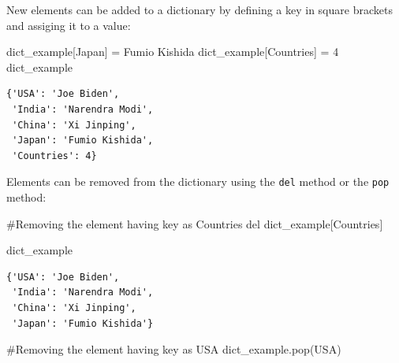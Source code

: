 \documentclass[
  letterpaper,
  DIV=11,
  numbers=noendperiod]{scrreprt}
\newenvironment{Shaded}{\begin{snugshade}}{\end{snugshade}}
\newcommand{\CommentTok}[1]{\textcolor[rgb]{0.37,0.37,0.37}{#1}}
\newcommand{\DecValTok}[1]{\textcolor[rgb]{0.68,0.00,0.00}{#1}}
\newcommand{\KeywordTok}[1]{\textcolor[rgb]{0.00,0.23,0.31}{#1}}
\newcommand{\NormalTok}[1]{\textcolor[rgb]{0.00,0.23,0.31}{#1}}
\newcommand{\OperatorTok}[1]{\textcolor[rgb]{0.37,0.37,0.37}{#1}}
\newcommand{\StringTok}[1]{\textcolor[rgb]{0.13,0.47,0.30}{#1}}
\begin{document}
New elements can be added to a dictionary by defining a key in square
brackets and assiging it to a value:

\begin{Shaded}
\begin{Highlighting}[]
\NormalTok{dict\_example[}\StringTok{\textquotesingle{}Japan\textquotesingle{}}\NormalTok{] }\OperatorTok{=} \StringTok{\textquotesingle{}Fumio Kishida\textquotesingle{}}
\NormalTok{dict\_example[}\StringTok{\textquotesingle{}Countries\textquotesingle{}}\NormalTok{] }\OperatorTok{=} \DecValTok{4}
\NormalTok{dict\_example}
\end{Highlighting}
\end{Shaded}

\begin{verbatim}
{'USA': 'Joe Biden',
 'India': 'Narendra Modi',
 'China': 'Xi Jinping',
 'Japan': 'Fumio Kishida',
 'Countries': 4}
\end{verbatim}

Elements can be removed from the dictionary using the \texttt{del}
method or the \texttt{pop} method:

\begin{Shaded}
\begin{Highlighting}[]
\CommentTok{\#Removing the element having key as \textquotesingle{}Countries\textquotesingle{}}
\KeywordTok{del}\NormalTok{ dict\_example[}\StringTok{\textquotesingle{}Countries\textquotesingle{}}\NormalTok{]}
\end{Highlighting}
\end{Shaded}

\begin{Shaded}
\begin{Highlighting}[]
\NormalTok{dict\_example}
\end{Highlighting}
\end{Shaded}

\begin{verbatim}
{'USA': 'Joe Biden',
 'India': 'Narendra Modi',
 'China': 'Xi Jinping',
 'Japan': 'Fumio Kishida'}
\end{verbatim}

\begin{Shaded}
\begin{Highlighting}[]
\CommentTok{\#Removing the element having key as \textquotesingle{}USA\textquotesingle{}}
\NormalTok{dict\_example.pop(}\StringTok{\textquotesingle{}USA\textquotesingle{}}\NormalTok{)}
\end{Highlighting}
\end{Shaded}
\end{document}
